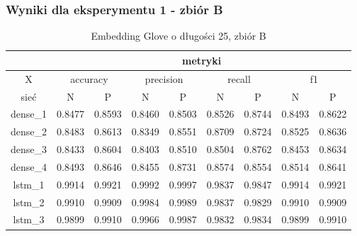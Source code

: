 \newpage %
\subsubsection{Wyniki dla eksperymentu 1 - zbiór B}


\begin{table}[h] \centering
    \caption{Embedding Glove o długości 25, zbiór B}
    \label{tab:wyniki_glove_B}
    \begin{tabular} {|c|c|c|c|c|c|c|c|c| }    \hline
                 & \multicolumn{8}{c|}{metryki}                                                                                                                               \\ \hline
        X        & \multicolumn{2}{c|}{accuracy} & \multicolumn{2}{c|}{precision} & \multicolumn{2}{c|}{recall} & \multicolumn{2}{c|}{f1}                                     \\ \hline
        sieć     & N                             & P                              & N                           & P                       & N      & P      & N      & P      \\ \hline
        dense\_1 & 0.8477                        & 0.8593                         & 0.8460                      & 0.8503                  & 0.8526 & 0.8744 & 0.8493 & 0.8622 \\ \hline
        dense\_2 & 0.8483                        & 0.8613                         & 0.8349                      & 0.8551                  & 0.8709 & 0.8724 & 0.8525 & 0.8636 \\ \hline
        dense\_3 & 0.8433                        & 0.8604                         & 0.8403                      & 0.8510                  & 0.8504 & 0.8762 & 0.8453 & 0.8634 \\ \hline
        dense\_4 & 0.8493                        & 0.8646                         & 0.8455                      & 0.8731                  & 0.8574 & 0.8554 & 0.8514 & 0.8641 \\ \hline
        lstm\_1  & 0.9914                        & 0.9921                         & 0.9992                      & 0.9997                  & 0.9837 & 0.9847 & 0.9914 & 0.9921 \\ \hline
        lstm\_2  & 0.9910                        & 0.9909                         & 0.9984                      & 0.9989                  & 0.9837 & 0.9829 & 0.9910 & 0.9909 \\ \hline
        lstm\_3  & 0.9899                        & 0.9910                         & 0.9966                      & 0.9987                  & 0.9832 & 0.9834 & 0.9899 & 0.9910 \\ \hline

\end{tabular}
\end{table}
